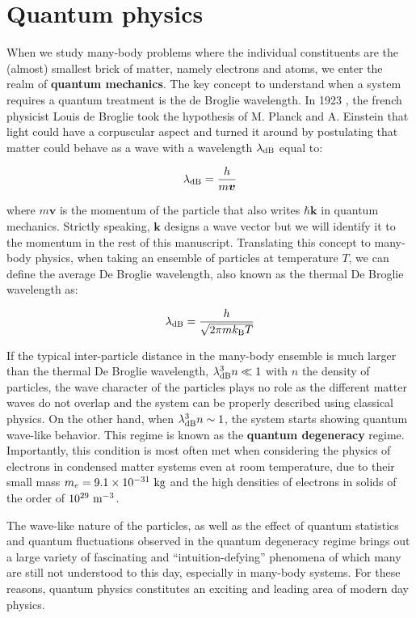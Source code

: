 \section*{Quantum physics}

When we study many-body problems where the individual constituents are the (almost) smallest brick of matter, namely electrons and atoms, we enter the realm of \textbf{quantum mechanics}. The key concept to understand when a system requires a quantum treatment is the de Broglie wavelength. In 1923 \cite{debroglie:tel-00006807}, the french physicist Louis de Broglie took the hypothesis of M. Planck and A. Einstein that light could have a corpuscular aspect and turned it around by postulating that matter could behave as a wave with a wavelength $\lambda_{\rm{dB}}$ equal to:

\begin{equation}
    \lambda_{\rm{dB}} = \frac{h}{m\bm{v}}
\end{equation}

\noindent where $m\bm{v}$ is the momentum of the particle that also writes $\hbar \bm{k}$ in quantum mechanics. Strictly speaking, $\bm{k}$ designs a wave vector but we will identify it to the momentum in the rest of this manuscript. Translating this concept to many-body physics, when taking an ensemble of particles at temperature $T$, we can define the average De Broglie wavelength, also known as the thermal De Broglie wavelength as:

\begin{equation}
    \lambda_{\rm{dB}} = \frac{h}{\sqrt{2 \pi m k_{\mathrm{B}} T}}
\end{equation}

\noindent If the typical inter-particle distance in the many-body ensemble is much larger than the thermal De Broglie wavelength, \ie $\lambda_{\rm{dB}}^3 n \ll 1$ with $n$ the density of particles, the wave character of the particles plays no role as the different matter waves do not overlap and the system can be properly described using classical physics. On the other hand, when $\lambda_{\rm{dB}}^3 n \sim 1$, the system starts showing quantum wave-like behavior. This regime is known as the \textbf{quantum degeneracy} regime. Importantly, this condition is most often met when considering the physics of electrons in condensed matter systems even at room temperature, due to their small mass $m_e = 9.1 \times 10^{-31} \ \rm{kg}$ and the high densities of electrons in solids of the order of $10^{29} \ \rm{m}^{-3}$.

The wave-like nature of the particles, as well as the effect of quantum statistics and quantum fluctuations observed in the quantum degeneracy regime brings out a large variety of fascinating and ``intuition-defying'' phenomena of which many are still not understood to this day, especially in many-body systems. For these reasons, quantum physics constitutes an exciting and leading area of modern day physics.

